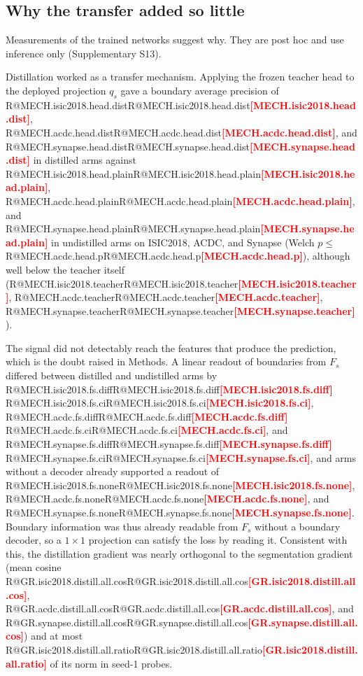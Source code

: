 \documentclass[fleqn,10pt,lineno]{wlpeerj}
\makeatletter
\newcommand{\R}[1]{\ifcsname R@#1\endcsname\csname R@#1\endcsname\else\textbf{\textcolor{red}{[#1]}}\fi}
\makeatother
\begin{document}
\begin{table}[ht]
\centering
\resizebox{\linewidth}{!}{}
\caption{\label{tab:arms}All retrained arms relative to the retrained U-Net, seeds 1--3: oriented mean differences (positive favors the arm; HD95 in pixels with the sign reversed). ISIC2018: official test set. $^{*}$Holm $p<0.05$ within family and dataset with an interval excluding zero, which concerns fixed models and not recipes (see ``How large an effect can be resolved?''). $^{\dagger}$The difference between run means exceeds the run-level margin. The retrained ACDC U-Net is a low reference (see text). Further contrasts and the individual runs are in Supplementary S5--S7.}
\end{table}

\subsection*{Why the transfer added so little}
Measurements of the trained networks suggest why. They are post hoc and use inference only (Supplementary S13).

Distillation worked as a transfer mechanism. Applying the frozen teacher head to the deployed projection $q_s$ gave a boundary average precision of \R{MECH.isic2018.head.dist}, \R{MECH.acdc.head.dist}, and \R{MECH.synapse.head.dist} in distilled arms against \R{MECH.isic2018.head.plain}, \R{MECH.acdc.head.plain}, and \R{MECH.synapse.head.plain} in undistilled arms on ISIC2018, ACDC, and Synapse (Welch $p\le$\,\R{MECH.acdc.head.p}), although well below the teacher itself (\R{MECH.isic2018.teacher}, \R{MECH.acdc.teacher}, \R{MECH.synapse.teacher}).

The signal did not detectably reach the features that produce the prediction, which is the doubt raised in Methods. A linear readout of boundaries from $F_s$ differed between distilled and undistilled arms by \R{MECH.isic2018.fs.diff} \R{MECH.isic2018.fs.ci}, \R{MECH.acdc.fs.diff} \R{MECH.acdc.fs.ci}, and \R{MECH.synapse.fs.diff} \R{MECH.synapse.fs.ci}, and arms without a decoder already supported a readout of \R{MECH.isic2018.fs.none}, \R{MECH.acdc.fs.none}, and \R{MECH.synapse.fs.none}. Boundary information was thus already readable from $F_s$ without a boundary decoder, so a $1\times1$ projection can satisfy the loss by reading it. Consistent with this, the distillation gradient was nearly orthogonal to the segmentation gradient (mean cosine \R{GR.isic2018.distill.all.cos}, \R{GR.acdc.distill.all.cos}, and \R{GR.synapse.distill.all.cos}) and at most \R{GR.isic2018.distill.all.ratio} of its norm in seed-1 probes.
\end{document}

